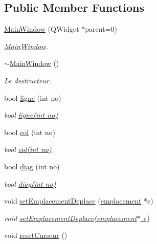 \subsection*{Public Member Functions}
\begin{DoxyCompactItemize}
\item 
\hyperlink{classMainWindow_a8b244be8b7b7db1b08de2a2acb9409db}{Main\-Window} (Q\-Widget $\ast$parent=0)
\begin{DoxyCompactList}\small\item\em \hyperlink{classMainWindow}{Main\-Window}. \end{DoxyCompactList}\item 
\hyperlink{classMainWindow_ae98d00a93bc118200eeef9f9bba1dba7}{$\sim$\-Main\-Window} ()
\begin{DoxyCompactList}\small\item\em Le destructeur. \end{DoxyCompactList}\item 
bool \hyperlink{classMainWindow_a6dc1f84d9bc6e8ab7f1bb6bc04e2db49}{ligne} (int no)
\begin{DoxyCompactList}\small\item\em bool \hyperlink{classMainWindow_a6dc1f84d9bc6e8ab7f1bb6bc04e2db49}{ligne(int no)} \end{DoxyCompactList}\item 
bool \hyperlink{classMainWindow_a85653198b42750c0f09876f0af3715d7}{col} (int no)
\begin{DoxyCompactList}\small\item\em bool \hyperlink{classMainWindow_a85653198b42750c0f09876f0af3715d7}{col(int no)} \end{DoxyCompactList}\item 
bool \hyperlink{classMainWindow_a7b80bba7c56fbcc016dbc004d208ec31}{diag} (int no)
\begin{DoxyCompactList}\small\item\em bool \hyperlink{classMainWindow_a7b80bba7c56fbcc016dbc004d208ec31}{diag(int no)} \end{DoxyCompactList}\item 
void \hyperlink{classMainWindow_a1eefa05031d74694e4249a8c68741122}{set\-Emplacement\-Deplace} (\hyperlink{classemplacement}{emplacement} $\ast$e)
\begin{DoxyCompactList}\small\item\em void \hyperlink{classMainWindow_a1eefa05031d74694e4249a8c68741122}{set\-Emplacement\-Deplace(emplacement$\ast$ e)} \end{DoxyCompactList}\item 
\hypertarget{classMainWindow_a3ab75adb0221eb5e362f2070f71ebc22}{void \hyperlink{classMainWindow_a3ab75adb0221eb5e362f2070f71ebc22}{reset\-Curseur} ()}\label{classMainWindow_a3ab75adb0221eb5e362f2070f71ebc22}


\end{DoxyCompactItemize}
